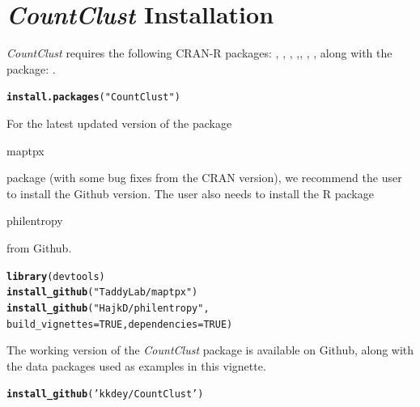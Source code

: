 \documentclass[12pt]{article}\usepackage[]{graphicx}\usepackage[usenames,dvipsnames]{color}
\makeatletter
\newcommand{\hlnum}[1]{\textcolor[rgb]{0.686,0.059,0.569}{#1}}%
\newcommand{\hlstr}[1]{\textcolor[rgb]{0.192,0.494,0.8}{#1}}%
\newcommand{\hlstd}[1]{\textcolor[rgb]{0.345,0.345,0.345}{#1}}%
\newcommand{\hlkwc}[1]{\textcolor[rgb]{0.333,0.667,0.333}{#1}}%
\newcommand{\hlkwd}[1]{\textcolor[rgb]{0.737,0.353,0.396}{\textbf{#1}}}%
\newenvironment{kframe}{%
 \def\at@end@of@kframe{}%
 \ifinner\ifhmode%
  \def\at@end@of@kframe{\end{minipage}}%
  \begin{minipage}{\columnwidth}%
 \fi\fi%
 \def\FrameCommand##1{\hskip\@totalleftmargin \hskip-\fboxsep
 \colorbox{shadecolor}{##1}\hskip-\fboxsep
     \hskip-\linewidth \hskip-\@totalleftmargin \hskip\columnwidth}%
 \MakeFramed {\advance\hsize-\width
   \@totalleftmargin\z@ \linewidth\hsize
   \@setminipage}}%
 {\par\unskip\endMakeFramed%
 \at@end@of@kframe}
\newenvironment{knitrout}{}{} %
\newcommand{\CountClust}{\textit{CountClust}}
\makeatother
\begin{document}
\section{\CountClust{} Installation}

\CountClust{} requires the following CRAN-R packages: , ,  , ,, , ,
 along with the \Bioconductor{} package: .

\begin{knitrout}
\color{fgcolor}\begin{kframe}
\begin{alltt}
\hlkwd{install.packages}\hlstd{(}\hlstr{"CountClust"}\hlstd{)}
\end{alltt}
\end{kframe}
\end{knitrout}

For the latest updated version of the package \begin{verb} maptpx \end{verb} package (with some bug fixes from the CRAN version), we recommend the user to install the Github version. The user also needs to install the R package \begin{verb} philentropy \end{verb} from Github.

\begin{knitrout}
\color{fgcolor}\begin{kframe}
\begin{alltt}
\hlkwd{library}\hlstd{(devtools)}
\hlkwd{install_github}\hlstd{(}\hlstr{"TaddyLab/maptpx"}\hlstd{)}
\hlkwd{install_github}\hlstd{(}\hlstr{"HajkD/philentropy"}\hlstd{,}
               \hlkwc{build_vignettes} \hlstd{=} \hlnum{TRUE}\hlstd{,}   \hlkwc{dependencies} \hlstd{=} \hlnum{TRUE}\hlstd{)}
\end{alltt}
\end{kframe}
\end{knitrout}

The working version of the \CountClust{} package is available on Github, along with the data packages used as examples in this vignette.

\begin{knitrout}
\color{fgcolor}\begin{kframe}
\begin{alltt}
\hlkwd{install_github}\hlstd{(}\hlstr{'kkdey/CountClust'}\hlstd{)}
\end{alltt}
\end{kframe}
\end{knitrout}
\end{document}
